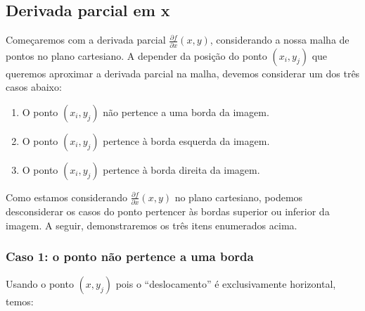 \documentclass[11pt]{article}
\begin{document}

  \subsection{Derivada parcial em x}

  \indent\indent Começaremos com a derivada parcial $\frac{\partial f}{\partial x}(x, y)$, considerando a nossa malha de pontos no plano cartesiano. A depender da posição do ponto  $(x_i, y_j)$ que
  queremos aproximar a derivada parcial na malha, devemos considerar um dos três casos abaixo:


  \begin{enumerate}[label=\textbf{\arabic*.}]
    \item O ponto $(x_i, y_j)$ não pertence a uma borda da imagem.
    \item O ponto $(x_i, y_j)$ pertence à borda esquerda da imagem.
    \item O ponto $(x_i, y_j)$ pertence à borda direita da imagem.
  \end{enumerate}

  Como estamos considerando $\frac{\partial f}{\partial x}(x, y)$ no plano cartesiano, podemos desconsiderar os casos do ponto pertencer às bordas superior ou inferior da imagem. A seguir, demonstraremos os três itens
  enumerados acima.

  \pagebreak

  \subsubsection{Caso 1: o ponto não pertence a uma borda}

  \indent\indent Usando o ponto $(x, y_j)$ pois o ``deslocamento'' é exclusivamente horizontal, temos:
\end{document}
